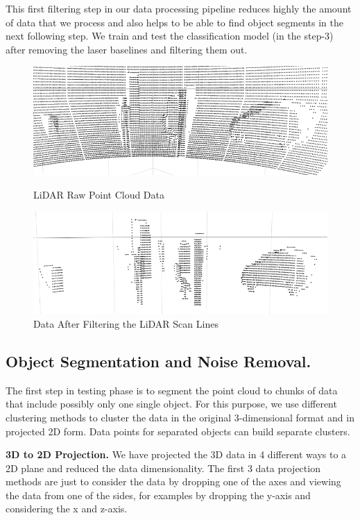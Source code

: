 This first filtering step in our data processing pipeline reduces highly the amount of data that we process and 
also helps to be able to find object segments in the next following step.
We train and test the classification model (in the step-3) after removing the laser baselines and
filtering them out.
%
\begin{figure}[!h]
\centering
\begin{minipage}{0.49\textwidth}
  \centering
        \includegraphics[width=.9\linewidth]{images/ground_before2.png}
        \caption{LiDAR Raw Point Cloud Data}
        \label{fig:ground_before}
\end{minipage}%
\begin{minipage}{0.49\textwidth}
  \centering
        \includegraphics[width=.9\linewidth]{images/ground_after2.png}
        \caption{Data After Filtering the LiDAR Scan Lines}
        \label{fig:after}
\end{minipage}%
\end{figure}
%
%
\subsection{Object Segmentation and Noise Removal.}
The first step in testing phase is to segment the point cloud to chunks of data that include
possibly only one single object. For this purpose, we use different clustering
methods to cluster the data in the original 3-dimensional format and in projected 2D form. 
Data points for separated objects can build separate clusters. 


\textbf{3D to 2D Projection.} 
We have projected the 3D data in 4 different ways to a 2D plane and reduced the data dimensionality.
The first 3 data projection methods are just to consider the data by dropping one of the axes and
viewing the data from one of the sides, for examples by dropping the y-axis and considering the x
and z-axis.


